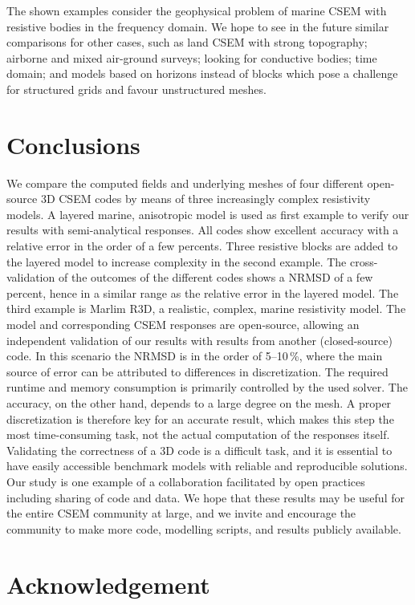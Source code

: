 \documentclass[
    paper,
  ]{geophysics}
\begin{document}
The shown examples consider the geophysical problem of marine CSEM with resistive bodies in the frequency domain. We hope to see in the future similar comparisons for other cases, such as land CSEM with strong topography; airborne and mixed air-ground surveys; looking for conductive bodies; time domain; and models based on horizons instead of blocks which pose a challenge for structured grids and favour unstructured meshes. 

\section{Conclusions}

We compare the computed fields and underlying meshes of four different open-source 3D CSEM codes by means of three increasingly complex resistivity models. A layered marine, anisotropic model is used as first example to verify our results with semi-analytical responses. All codes show excellent accuracy with a relative error in the order of a few percents. Three resistive blocks are added to the layered model to increase complexity in the second example. The cross-validation of the outcomes of the different codes shows a NRMSD of a few percent, hence in a similar range as the relative error in the layered model. The third example is Marlim R3D, a realistic, complex, marine resistivity model. The model and corresponding CSEM responses are open-source, allowing an independent validation of our results with results from another (closed-source) code. In this scenario the NRMSD is in the order of 5--10\,\%, where the main source of error can be attributed to differences in discretization. The required runtime and memory consumption is primarily controlled by the used solver. The accuracy, on the other hand, depends to a large degree on the mesh. A proper discretization is therefore key for an accurate result, which makes this step the most time-consuming task, not the actual computation of the responses itself. Validating the correctness of a 3D code is a difficult task, and it is essential to have easily accessible benchmark models with reliable and reproducible solutions. Our study is one example of a collaboration facilitated by open practices including sharing of code and data. We hope that these results may be useful for the entire CSEM community at large, and we invite and encourage the community to make more code, modelling scripts, and results publicly available.


\section{Acknowledgement}
\end{document}
